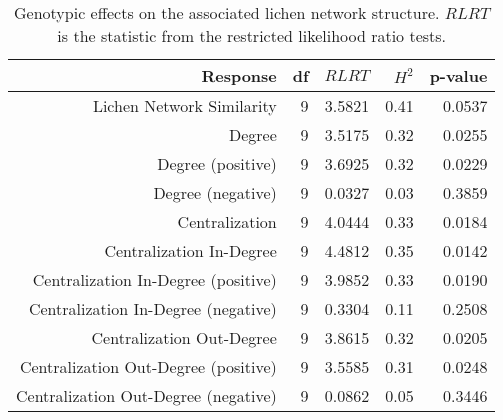 \begin{table}[ht]
\centering
\begin{tabular}{rrrrr}
  \hline
Response & df & $RLRT$ & $H^2$ & p-value \\ 
  \hline
Lichen Network Similarity & 9 & 3.5821 & 0.41 & 0.0537 \\ 
  Degree & 9 & 3.5175 & 0.32 & 0.0255 \\ 
  Degree (positive) & 9 & 3.6925 & 0.32 & 0.0229 \\ 
  Degree (negative) & 9 & 0.0327 & 0.03 & 0.3859 \\ 
  Centralization & 9 & 4.0444 & 0.33 & 0.0184 \\ 
  Centralization In-Degree & 9 & 4.4812 & 0.35 & 0.0142 \\ 
  Centralization In-Degree (positive) & 9 & 3.9852 & 0.33 & 0.0190 \\ 
  Centralization In-Degree (negative) & 9 & 0.3304 & 0.11 & 0.2508 \\ 
  Centralization Out-Degree & 9 & 3.8615 & 0.32 & 0.0205 \\ 
  Centralization Out-Degree (positive) & 9 & 3.5585 & 0.31 & 0.0248 \\ 
  Centralization Out-Degree (negative) & 9 & 0.0862 & 0.05 & 0.3446 \\ 
   \hline
\end{tabular}
\caption{Genotypic effects on the associated lichen network structure. $RLRT$ is the statistic from the restricted likelihood ratio tests.} 
\label{tab:h2_net}
\end{table}
